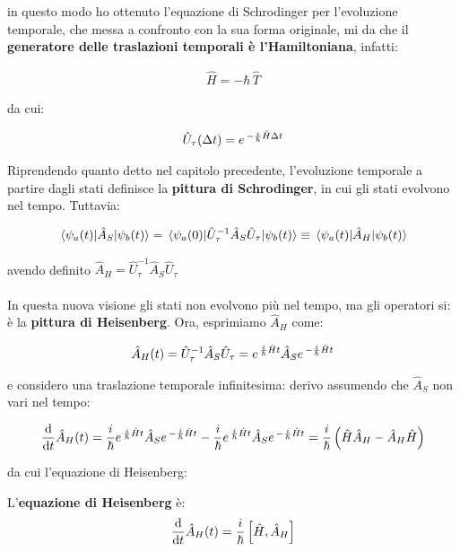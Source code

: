 	in questo modo ho ottenuto l'equazione di Schrodinger per l'evoluzione temporale, che messa a confronto con la sua forma originale, mi da che il \textbf{generatore delle traslazioni temporali è l'Hamiltoniana}, infatti:

\begin{align*}
	\hat{H} = - \hbar \, \hat{T}
\end{align*}

	da cui:
	
\begin{align*}
	\hat{U}_{\tau} \qty(\Delta t) = e^{\, - \frac{i}{\hbar} \hat{H} \Delta t}
\end{align*}

	Riprendendo quanto detto nel capitolo precedente, l'evoluzione temporale a partire dagli stati definisce la \textbf{pittura di Schrodinger}, in cui gli stati evolvono nel tempo. Tuttavia:
	
\begin{align*}
	\mel{\psi_a\qty(t)}{\hat{A}_S}{\psi_b\qty(t)} = \mel{\psi_a\qty(0)}{\hat{U}_{\tau}^{-1} \hat{A}_S \hat{U}_{\tau}}{\psi_b\qty(t)} \equiv \mel{\psi_a\qty(t)}{\hat{A}_H}{\psi_b\qty(t)}
\end{align*}

	avendo definito $\hat{A}_H = \hat{U}_{\tau}^{-1} \hat{A}_S \hat{U}_{\tau}$
	\\
	\\
	In questa nuova visione gli stati non evolvono più nel tempo, ma gli operatori si: è la \textbf{pittura di Heisenberg}. Ora, esprimiamo $\hat{A}_H$ come:
	
\begin{align*}
	\hat{A}_H\qty(t) = \hat{U}_{\tau}^{-1} \hat{A}_S \hat{U}_{\tau} = e^{\, \frac{i}{\hbar} \hat{H} t} \hat{A}_S e^{\, - \frac{i}{\hbar} \hat{H} t}
\end{align*}

	e considero una traslazione temporale infinitesima: derivo assumendo che $\hat{A}_S$ non vari nel tempo:
	
\begin{align*}
	\dv{t} \hat{A}_H\qty(t) = \frac{i}{\hbar} e^{\, \frac{i}{\hbar} \hat{H} t} \hat{A}_S e^{\, - \frac{i}{\hbar} \hat{H} t} - \frac{i}{\hbar} e^{\, \frac{i}{\hbar} \hat{H} t} \hat{A}_S e^{\, - \frac{i}{\hbar} \hat{H} t} = \frac{i}{\hbar} \, \qty(\hat{H} \hat{A}_H - \hat{A}_H \hat{H})
\end{align*}

	da cui l'equazione di Heisenberg:
	
\begin{mydef}
	L'\textbf{equazione di Heisenberg} è:
\begin{align*}
	\dv{t} \hat{A}_H\qty(t) = \frac{i}{\hbar} \, \qty[\hat{H}, \hat{A}_H]
\end{align*}
\end{mydef}

